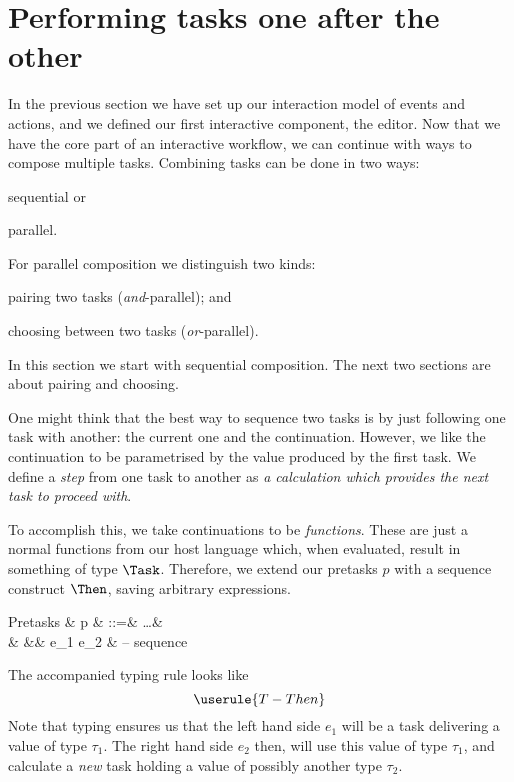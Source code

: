 
\section{Performing tasks one after the other}

In the previous section we have set up our interaction model of events and actions,
and we defined our first interactive component, the editor.
Now that we have the core part of an interactive workflow,
we can continue with ways to compose multiple tasks.
Combining tasks can be done in two ways:
\begin{enumerate*}
  \item sequential or
  \item parallel.
\end{enumerate*}
For parallel composition we distinguish two kinds:
\begin{enumerate*}[(a)]
  \item pairing two tasks (\emph{and}-parallel); and
  \item choosing between two tasks (\emph{or}-parallel).
\end{enumerate*}
In this section we start with sequential composition.
The next two sections are about pairing and choosing.

One might think that the best way to sequence two tasks is by just following one task with another:
the current one and the continuation.
However, we like the continuation to be parametrised by the value produced by the first task.
We define a \emph{step} from one task to another as \emph{a calculation which provides the next task to proceed with}.

To accomplish this,
we take continuations to be \emph{functions}.
These are just a normal functions from our host language which,
when evaluated, result in something of type $\Task$.
Therefore,
we extend our pretasks $p$ with a sequence construct $\Then$,
saving arbitrary expressions.
\begin{grammar}
  Pretasks
    & p & ::=& \ldots        & \\
    &   &\mid& e_1 \Then e_2 & – sequence \\
\end{grammar}
The accompanied typing rule looks like
\begin{equation*}
  \userule{T-Then}
\end{equation*}
Note that typing ensures us that the left hand side $e_1$ will be a task delivering a value of type $\tau_1$.
The right hand side $e_2$ then, will use this value of type $\tau_1$,
and calculate a \emph{new} task holding a value of possibly another type $\tau_2$.


